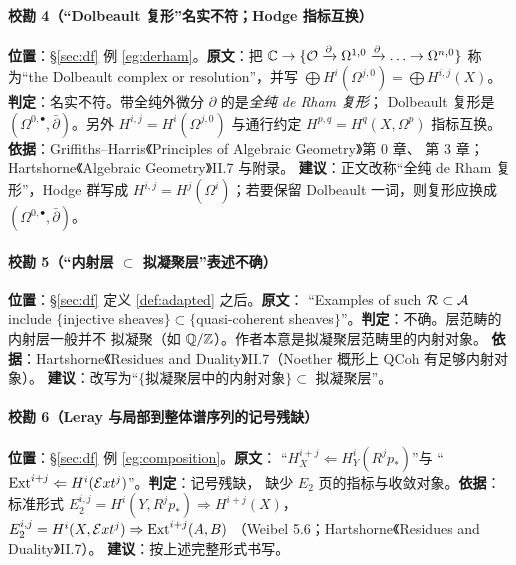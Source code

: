 \paragraph{校勘 4（“Dolbeault 复形”名实不符；Hodge 指标互换）}
\textbf{位置}：§\ref{sec:df} 例 \ref{eg:derham}。\textbf{原文}：把
$\mathbb{C}\to\{\mathcal{O}\xrightarrow{\partial}\Omega^{1,0}\xrightarrow{\partial}\ldots
\to\Omega^{n,0}\}$ 称为“the Dolbeault complex or resolution”，并写
$\bigoplus H^i(\Omega^{j,0})=\bigoplus H^{i,j}(X)$。
\textbf{判定}：名实不符。带全纯外微分 $\partial$ 的是\emph{全纯 de Rham 复形}；
Dolbeault 复形是 $(\Omega^{0,\bullet},\bar\partial)$。另外
$H^{i,j}=H^i(\Omega^{j,0})$ 与通行约定 $H^{p,q}=H^q(X,\Omega^p)$ 指标互换。
\textbf{依据}：Griffiths--Harris《Principles of Algebraic Geometry》第 0 章、
第 3 章；Hartshorne《Algebraic Geometry》II.7 与附录。
\textbf{建议}：正文改称“全纯 de Rham 复形”，Hodge 群写成
$H^{i,j}=H^j(\Omega^i)$；若要保留 Dolbeault 一词，则复形应换成
$(\Omega^{0,\bullet},\bar\partial)$。

\paragraph{校勘 5（“内射层 $\subset$ 拟凝聚层”表述不确）}
\textbf{位置}：§\ref{sec:df} 定义 \ref{def:adapted} 之后。\textbf{原文}：
“Examples of such $\mathcal{R}\subset\mathcal{A}$ include $\{$injective sheaves$\}\subset
\{$quasi-coherent sheaves$\}$”。\textbf{判定}：不确。层范畴的内射层一般并不
拟凝聚（如 $\mathbb Q/\mathbb{Z}$）。作者本意是拟凝聚层范畴里的内射对象。
\textbf{依据}：Hartshorne《Residues and Duality》II.7（Noether 概形上
$\mathrm{QCoh}$ 有足够内射对象）。
\textbf{建议}：改写为“$\{$拟凝聚层中的内射对象$\}\subset$ 拟凝聚层”。

\paragraph{校勘 6（Leray 与局部到整体谱序列的记号残缺）}
\textbf{位置}：§\ref{sec:df} 例 \ref{eg:composition}。\textbf{原文}：
“$H^{i+j}_X\Leftarrow H^i_Y(R^jp_*)$”与
“$\operatorname{Ext}^{i+j}\Leftarrow H^i(\mathcal Ext^j)$”。\textbf{判定}：记号残缺，
缺少 $E_2$ 页的指标与收敛对象。\textbf{依据}：标准形式
$E_2^{i,j}=H^i(Y,R^jp_*)\Rightarrow H^{i+j}(X)$，
$E_2^{i,j}=H^i(X,\mathcal Ext^j)\Rightarrow\operatorname{Ext}^{i+j}(A,B)$
（Weibel 5.6；Hartshorne《Residues and Duality》II.7）。
\textbf{建议}：按上述完整形式书写。

